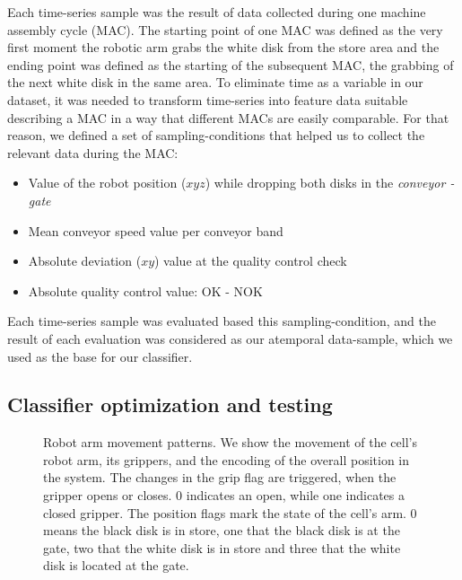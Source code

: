 \documentclass[5p,times,procedia]{elsarticle}
\begin{document}
Each time-series sample was the result of data collected during one machine assembly cycle (MAC). The starting point of one MAC was defined as the very first moment the robotic arm grabs the white disk from the store area and the ending point was defined as the starting of the subsequent MAC, the grabbing of the next white disk in the same area.
To eliminate time as a variable in our dataset, it was needed to transform time-series into feature data suitable describing a MAC in a way that different MACs are easily comparable. For that reason, we defined a set of sampling-conditions that helped us to collect the relevant data during the MAC:
\begin{itemize}
       \item Value of the robot position ($xyz$) while dropping both disks in the \textit{conveyor - gate}
       \item Mean conveyor speed value per conveyor band
       \item Absolute deviation ($xy$) value at the quality control check
       \item Absolute quality control value: OK - NOK
\end{itemize}

Each time-series sample was evaluated based this sampling-condition, and the result of each evaluation was considered as our atemporal data-sample, which we used as the base for our classifier.

\subsection{Classifier optimization and testing}\label{sec:ml_exp}

\begin{figure}
       
       \caption{Robot arm movement patterns. We show the movement of the 
                cell's robot arm, its grippers, and the encoding of the overall
                position in the system. The changes in the grip flag are triggered,
                when the gripper opens or closes. 0 indicates an open, while
                one indicates a closed gripper. The position flags mark the state
                of the cell's arm. 0 means the black disk is in store,
                one that the black disk is at the gate, two that the white disk
                is in store and three that the white disk is located at the gate.
             }
\label{fig:robot_pos_cell}
\end{figure}
\end{document}
